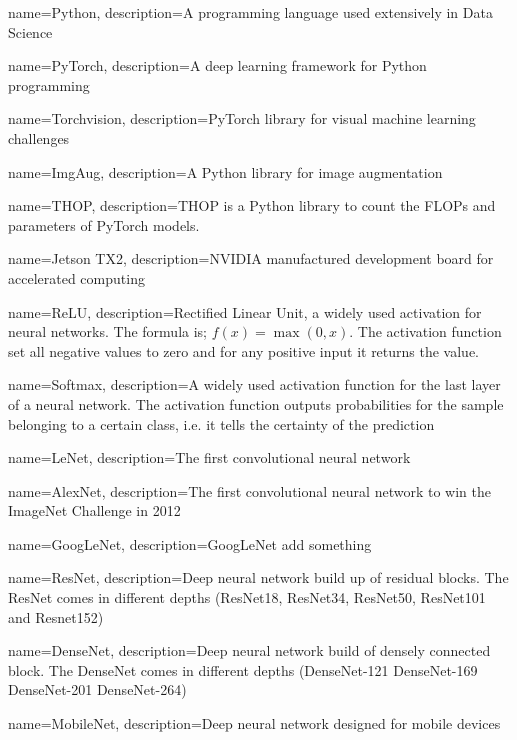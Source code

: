 {
	name=Python,
	description={A programming language used extensively in Data Science}
}

{
	name=PyTorch,
	description={A deep learning framework for Python programming}
}

{
	name={Torchvision},
	description={PyTorch library for visual machine learning challenges}
}

{
	name={ImgAug},
	description={A Python library for image augmentation}
}

{
	name={THOP},
	description={THOP is a Python library to count the FLOPs and parameters of PyTorch models.}
}

{
	name=Jetson TX2,
	description={NVIDIA manufactured development board for accelerated computing}
}


{
	name=ReLU,
	description={Rectified Linear Unit, a widely used activation for neural networks. The formula is; $f(x)=\max(0,x)$. The activation function set all negative values to zero and for any positive input it returns the value.}
}

{
	name=Softmax,
	description={A widely used activation function for the last layer of a neural network. The activation function outputs probabilities for the sample belonging to a certain class, i.e. it tells the certainty of the prediction}
}

{
	name={LeNet},
	description={The first convolutional neural network}
}

{
	name={AlexNet},
	description={The first convolutional neural network to win the ImageNet Challenge in 2012}
}

{
	name={GoogLeNet},
	description={GoogLeNet add something}
}

{
	name={ResNet},
	description={Deep neural network build up of residual blocks. The ResNet comes in different depths (ResNet18, ResNet34, ResNet50, ResNet101 and Resnet152)}
}

{
	name={DenseNet},
	description={Deep neural network build of densely connected block. The DenseNet comes in different depths (DenseNet-121 DenseNet-169 DenseNet-201 DenseNet-264)}
}

{
	name={MobileNet},
	description={Deep neural network designed for mobile devices}
}

